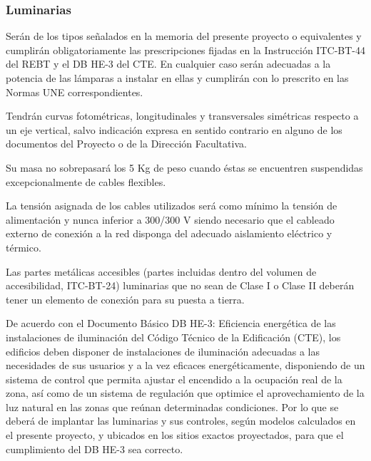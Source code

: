 \documentclass[../main.tex]{subfiles}
\begin{document}
\subsubsection{Luminarias}
Serán de los tipos señalados en la memoria del presente proyecto o equivalentes y cumplirán obligatoriamente las prescripciones fijadas en la Instrucción ITC-BT-44 del REBT y el DB HE-3 del CTE. En cualquier caso serán adecuadas a la potencia de las lámparas a instalar en ellas y cumplirán con lo prescrito en las Normas UNE correspondientes. \par
\vspace{0.5 cm}
Tendrán curvas fotométricas, longitudinales y transversales simétricas respecto a un eje vertical, salvo indicación expresa en sentido contrario en alguno de los documentos del Proyecto o de la Dirección Facultativa. \par
\vspace{0.5 cm}
Su masa no sobrepasará los 5 Kg de peso cuando éstas se encuentren suspendidas excepcionalmente de cables flexibles. \par
\vspace{0.5 cm}
La tensión asignada de los cables utilizados será como mínimo la tensión de alimentación y nunca inferior a 300/300 V siendo necesario que el cableado externo de conexión a la red disponga del adecuado aislamiento eléctrico y térmico. \par
\vspace{0.5 cm}
Las partes metálicas accesibles (partes incluidas dentro del volumen de accesibilidad, ITC-BT-24) luminarias que no sean de Clase I o Clase II deberán tener un elemento de conexión para su puesta a tierra. \par
\vspace{0.5 cm}
De acuerdo con el Documento Básico DB HE-3: Eficiencia energética de las instalaciones de iluminación del Código Técnico de la Edificación (CTE), los edificios deben disponer de instalaciones de iluminación adecuadas a las necesidades de sus usuarios y a la vez eficaces energéticamente, disponiendo de un sistema de control que permita ajustar el encendido a la ocupación real de la zona, así como de un sistema de regulación que optimice el aprovechamiento de la luz natural en las zonas que reúnan determinadas condiciones. Por lo que se deberá de implantar las luminarias y sus controles, según modelos calculados en el presente proyecto, y ubicados en los sitios exactos proyectados, para que el cumplimiento del DB HE-3 sea correcto.
\end{document}
